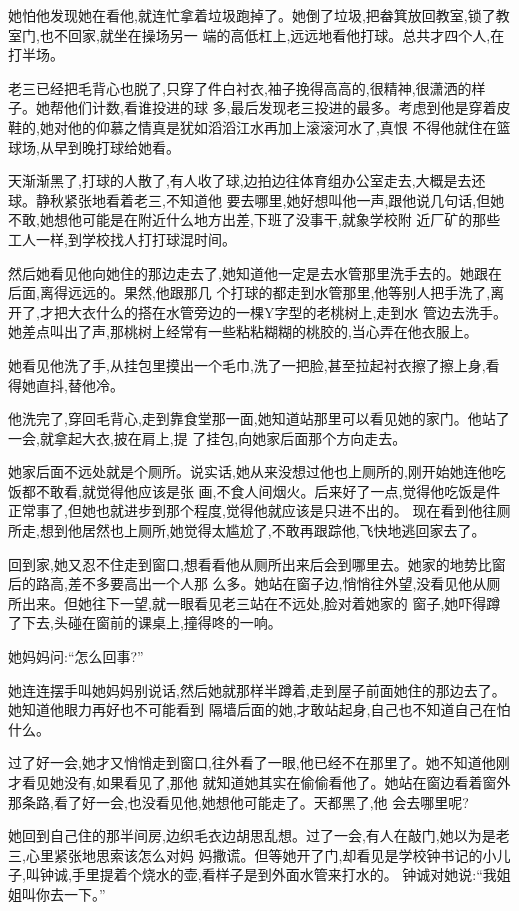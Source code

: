 ﻿\documentclass[12pt]{article}
\begin{document}
她怕他发现她在看他,就连忙拿着垃圾跑掉了。她倒了垃圾,把畚箕放回教室,锁了教室门,也不回家,就坐在操场另一
端的高低杠上,远远地看他打球。总共才四个人,在打半场。

老三已经把毛背心也脱了,只穿了件白衬衣,袖子挽得高高的,很精神,很潇洒的样子。她帮他们计数,看谁投进的球
多,最后发现老三投进的最多。考虑到他是穿着皮鞋的,她对他的仰慕之情真是犹如滔滔江水再加上滚滚河水了,真恨
不得他就住在篮球场,从早到晚打球给她看。

天渐渐黑了,打球的人散了,有人收了球,边拍边往体育组办公室走去,大概是去还球。静秋紧张地看着老三,不知道他
要去哪里,她好想叫他一声,跟他说几句话,但她不敢,她想他可能是在附近什么地方出差,下班了没事干,就象学校附
近厂矿的那些工人一样,到学校找人打打球混时间。

然后她看见他向她住的那边走去了,她知道他一定是去水管那里洗手去的。她跟在后面,离得远远的。果然,他跟那几
个打球的都走到水管那里,他等别人把手洗了,离开了,才把大衣什么的搭在水管旁边的一棵Y字型的老桃树上,走到水
管边去洗手。她差点叫出了声,那桃树上经常有一些粘粘糊糊的桃胶的,当心弄在他衣服上。

她看见他洗了手,从挂包里摸出一个毛巾,洗了一把脸,甚至拉起衬衣擦了擦上身,看得她直抖,替他冷。

他洗完了,穿回毛背心,走到靠食堂那一面,她知道站那里可以看见她的家门。他站了一会,就拿起大衣,披在肩上,提
了挂包,向她家后面那个方向走去。

她家后面不远处就是个厕所。说实话,她从来没想过他也上厕所的,刚开始她连他吃饭都不敢看,就觉得他应该是张
画,不食人间烟火。后来好了一点,觉得他吃饭是件正常事了,但她也就进步到那个程度,觉得他就应该是只进不出的。
现在看到他往厕所走,想到他居然也上厕所,她觉得太尴尬了,不敢再跟踪他,飞快地逃回家去了。

回到家,她又忍不住走到窗口,想看看他从厕所出来后会到哪里去。她家的地势比窗后的路高,差不多要高出一个人那
么多。她站在窗子边,悄悄往外望,没看见他从厕所出来。但她往下一望,就一眼看见老三站在不远处,脸对着她家的
窗子,她吓得蹲了下去,头碰在窗前的课桌上,撞得咚的一响。

她妈妈问:``怎么回事?''

她连连摆手叫她妈妈别说话,然后她就那样半蹲着,走到屋子前面她住的那边去了。她知道他眼力再好也不可能看到
隔墙后面的她,才敢站起身,自己也不知道自己在怕什么。

过了好一会,她才又悄悄走到窗口,往外看了一眼,他已经不在那里了。她不知道他刚才看见她没有,如果看见了,那他
就知道她其实在偷偷看他了。她站在窗边看着窗外那条路,看了好一会,也没看见他,她想他可能走了。天都黑了,他
会去哪里呢?

她回到自己住的那半间房,边织毛衣边胡思乱想。过了一会,有人在敲门,她以为是老三,心里紧张地思索该怎么对妈
妈撒谎。但等她开了门,却看见是学校钟书记的小儿子,叫钟诚,手里提着个烧水的壶,看样子是到外面水管来打水的。
钟诚对她说:``我姐姐叫你去一下。''
\end{document}

